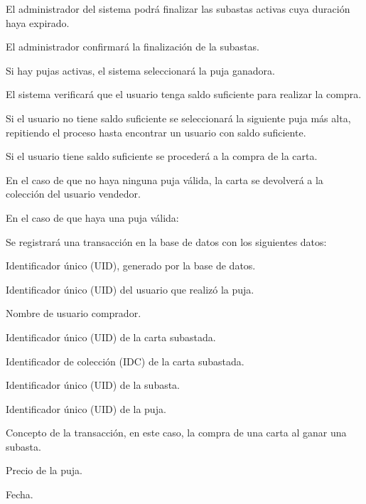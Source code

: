 \begin{RFSubastas}
\begin{RFSubastas}
\begin{RFSubastas}
		\end{RFSubastas}
	\end{RFSubastas}

	\item El administrador del sistema podrá finalizar las subastas activas cuya duración haya expirado.
	\begin{RFSubastas}
		\item El administrador confirmará la finalización de la subastas.
		\item Si hay pujas activas, el sistema seleccionará la puja ganadora.
		\begin{RFSubastas}
			\item El sistema verificará que el usuario tenga saldo suficiente para realizar la compra.
			\item Si el usuario no tiene saldo suficiente se seleccionará la siguiente puja más alta, repitiendo el proceso hasta encontrar un usuario con saldo suficiente.
			\item Si el usuario tiene saldo suficiente se procederá a la compra de la carta.
			\item En el caso de que no haya ninguna puja válida, la carta se devolverá a la colección del usuario vendedor.
			\item En el caso de que haya una puja válida:
			\begin{RFSubastas}
				\item Se registrará una transacción en la base de datos con los siguientes datos:
				\begin{RFSubastas}
					\item Identificador único (UID), generado por la base de datos.
					\item Identificador único (UID) del usuario que realizó la puja.
					\item Nombre de usuario comprador.
					\item Identificador único (UID) de la carta subastada.
					\item Identificador de colección (IDC) de la carta subastada.
					\item Identificador único (UID) de la subasta.
					\item Identificador único (UID) de la puja.
					\item Concepto de la transacción, en este caso, la compra de una carta al ganar una subasta.
					\item Precio de la puja.
					\item Fecha.
				\end{RFSubastas}

\end{RFSubastas}
\end{RFSubastas}
\end{RFSubastas}
\end{RFSubastas}
